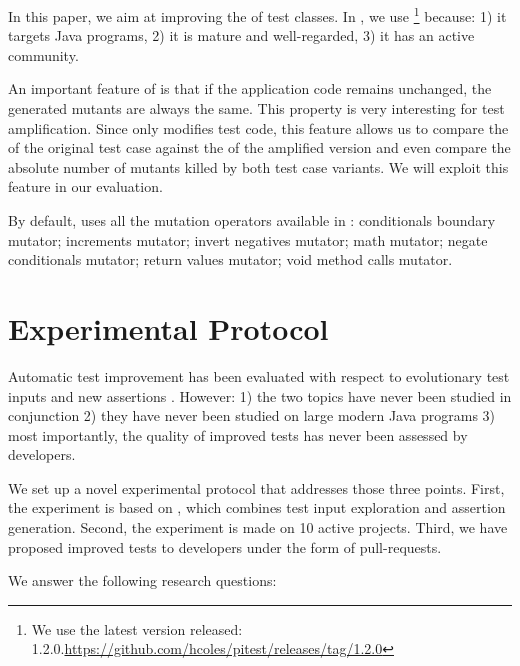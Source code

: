 \label{subsub:pitest}
In this paper, we aim at improving the \ms of test classes.  In \dspot, we use \pitest\footnote{We use the latest version released: 1.2.0.\url{https://github.com/hcoles/pitest/releases/tag/1.2.0}} because:
1) it targets Java programs, 
2) it is mature and well-regarded,
3) it has an active community. 

An important feature of \pitest is that if the application code remains unchanged, the generated mutants are always the same.
This property is very interesting for test amplification.
Since \dspot only modifies  test code, this feature allows us to compare the \ms of the original test case against the \ms of the amplified version and even compare the absolute number of mutants killed by both test case variants. 
We will exploit this feature in our evaluation.

By default, \dspot uses all the mutation operators available in \pitest: 
conditionals boundary mutator;
increments mutator;
invert negatives mutator;
math mutator;
negate conditionals mutator;
return values mutator;
void method calls mutator.


\section{Experimental  Protocol}
\label{sec:protocol}

Automatic test improvement has been evaluated with respect to evolutionary test inputs \cite{tonella} and new assertions \cite{TaoXie2006}. However:
1) the two topics have never been studied in conjunction
2) they have never been studied on large modern Java programs
3) most importantly, the quality of improved tests has never been assessed by developers.

We set up a novel experimental protocol that addresses those three points.
First, the experiment is based on \dspot, which combines test input exploration and assertion generation.
Second, the experiment is made on 10 active \gh projects.
Third, we have proposed improved tests to developers under the form of pull-requests.

We answer the following research questions:

\newcommand\rqpullrequest{RQ1\xspace}
\newcommand\rqcandidates{RQ2\xspace}
\newcommand\rqeffectiveness{RQ3\xspace}
\newcommand\rqAmplVersusIAmpl{RQ4\xspace}

